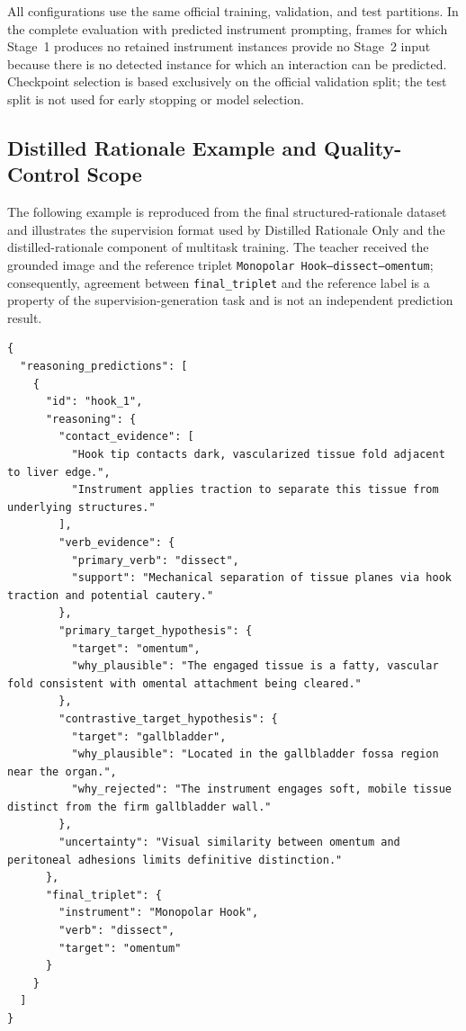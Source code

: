 All configurations use the same official training, validation, and test partitions. In the complete evaluation with predicted instrument prompting, frames for which Stage~1 produces no retained instrument instances provide no Stage~2 input because there is no detected instance for which an interaction can be predicted. Checkpoint selection is based exclusively on the official validation split; the test split is not used for early stopping or model selection.

\fi
\ifcFiveSupplement
\subsection{Distilled Rationale Example and Quality-Control Scope}
\label{sec:c5:appendix-rationale-example}

The following example is reproduced from the final structured-rationale dataset and illustrates the supervision format used by Distilled Rationale Only and the distilled-rationale component of multitask training. The teacher received the grounded image and the reference triplet \texttt{Monopolar Hook--dissect--omentum}; consequently, agreement between \texttt{final\_triplet} and the reference label is a property of the supervision-generation task and is not an independent prediction result.

\begin{lstlisting}[style=c5prompt]
{
  "reasoning_predictions": [
    {
      "id": "hook_1",
      "reasoning": {
        "contact_evidence": [
          "Hook tip contacts dark, vascularized tissue fold adjacent to liver edge.",
          "Instrument applies traction to separate this tissue from underlying structures."
        ],
        "verb_evidence": {
          "primary_verb": "dissect",
          "support": "Mechanical separation of tissue planes via hook traction and potential cautery."
        },
        "primary_target_hypothesis": {
          "target": "omentum",
          "why_plausible": "The engaged tissue is a fatty, vascular fold consistent with omental attachment being cleared."
        },
        "contrastive_target_hypothesis": {
          "target": "gallbladder",
          "why_plausible": "Located in the gallbladder fossa region near the organ.",
          "why_rejected": "The instrument engages soft, mobile tissue distinct from the firm gallbladder wall."
        },
        "uncertainty": "Visual similarity between omentum and peritoneal adhesions limits definitive distinction."
      },
      "final_triplet": {
        "instrument": "Monopolar Hook",
        "verb": "dissect",
        "target": "omentum"
      }
    }
  ]
}
\end{lstlisting}

